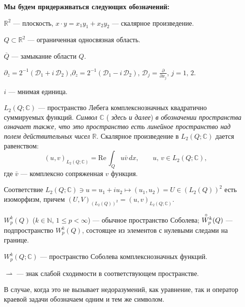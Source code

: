 \begin{list}{}{\leftmargin=10pt \itemsep=3pt}
\item\textbf{ Мы будем придерживаться следующих обозначений:}\\
\item $\mathbb R^2$ --- плоскость, $x\cdot y=x_1y_1+x_2y_2$ --- скалярное произведение.
\item $Q\subset \mathbb R^2$ --- ограниченная односвязная область.
\item $\overline{Q}$ --- замыкание области $Q$.
\item $\partial_{\bar z}=2^{-1}(\mathcal{D}_1+i\,\mathcal{D}_2)$,\quad $\partial_z=2^{-1}(\mathcal{D}_1-i\,\mathcal{D}_2)$,
\quad $\mathcal{D}_j=\frac{\partial}{\partial x_j}$,\quad
$j=1,\,2$.
\item $i$ --- мнимая единица.
\item $L_2(Q;\mathbb C)$ --- пространство Лебега комплекснозначных
квадратично суммируемых
функций. \textit{ Символ $\mathbb C$ }(\textit{ здесь и далее})
\textit{ в обозначении пространства означает также, что это
пространство есть линейное прост\-ранство над полем действительных чисел $\mathbb R$}.
Скалярное произведение в $L_2(Q;\mathbb C)$ дается равенством:
$$
(u,v)_{L_2(Q;\mathbb C)}=\text
{Re}\,\int_Qu\bar v\,dx,\qquad u,\,v\in L_2(Q;\mathbb C),
$$
где $\bar v$ --- комплексно сопряженная $v$ функция.

Соответствие
$L_2(Q;\mathbb C)\ni u=u_1+iu_2\mapsto (u_1,u_2)=U\in(L_2(Q))^2$ есть
изоморфизм, причем $(U,V)_{(L_2(Q))^2}=(u,v)_{L_2(Q;\mathbb C)}$.
\item $W_p^k(Q)$ ($k\in\mathbb{N}$, $1\leqslant p<\infty$) --- обычное
пространство Соболева; $\overset{\!\!\circ}{W_p^{\smash[t]k}}(Q)$ --- подпространство
$W_p^k(Q)$, состоящее из элементов с нулевыми следами на границе.
\item $W_p^k(Q;\mathbb C)$ --- пространство Соболева комплекснозначных
функций.
\item $\rightharpoonup$ --- знак слабой сходимости в соответствующем пространстве.
\item В случае, когда это не вызывает недоразумений, как
уравнение, так и оператор краевой задачи обозначаем одним и тем же
символом.
\end{list}




